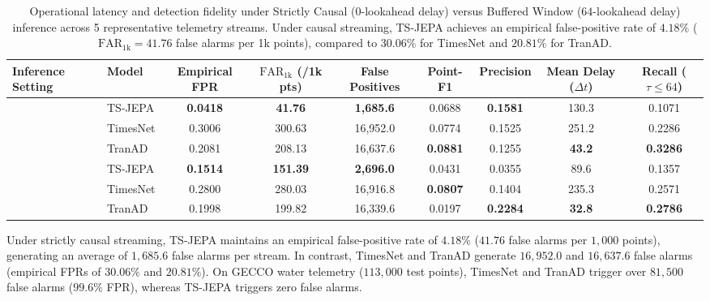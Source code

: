 \begin{table}[t]
\centering
\small
\caption{Operational latency and detection fidelity under Strictly Causal ($0$-lookahead delay) versus Buffered Window ($64$-lookahead delay) inference across 5 representative telemetry streams. Under causal streaming, TS-JEPA achieves an empirical false-positive rate of $4.18\%$ ($\text{FAR}_{1\text{k}} = 41.76$ false alarms per 1k points), compared to $30.06\%$ for TimesNet and $20.81\%$ for TranAD.}
\label{tab:causal_vs_buffered}
\scriptsize
\setlength{\tabcolsep}{2.5pt}
\begin{tabular}{@{}llccccccc@{}}
\toprule
\textbf{Inference Setting} & \textbf{Model} & \textbf{Empirical FPR} & \textbf{$\text{FAR}_{1\text{k}}$ (/1k pts)} & \textbf{False Positives} & \textbf{Point-F1} & \textbf{Precision} & \textbf{Mean Delay ($\Delta t$)} & \textbf{Recall ($\tau \le 64$)} \\
\midrule
{} 
& TS-JEPA & \textbf{0.0418} & \textbf{41.76} & \textbf{1,685.6} & 0.0688 & \textbf{0.1581} & 130.3 & 0.1071 \\
& TimesNet & 0.3006 & 300.63 & 16,952.0 & 0.0774 & 0.1525 & 251.2 & 0.2286 \\
& TranAD & 0.2081 & 208.13 & 16,637.6 & \textbf{0.0881} & 0.1255 & \textbf{43.2} & \textbf{0.3286} \\
\midrule
{} 
& TS-JEPA & \textbf{0.1514} & \textbf{151.39} & \textbf{2,696.0} & 0.0431 & 0.0355 & 89.6 & 0.1357 \\
& TimesNet & 0.2800 & 280.03 & 16,916.8 & \textbf{0.0807} & 0.1404 & 235.3 & 0.2571 \\
& TranAD & 0.1998 & 199.82 & 16,339.6 & 0.0197 & \textbf{0.2284} & \textbf{32.8} & \textbf{0.2786} \\
\bottomrule
\end{tabular}
\end{table}

Under strictly causal streaming, TS-JEPA maintains an empirical false-positive rate of $4.18\%$ ($41.76$ false alarms per $1{,}000$ points), generating an average of $1{,}685.6$ false alarms per stream. In contrast, TimesNet and TranAD generate $16{,}952.0$ and $16{,}637.6$ false alarms (empirical FPRs of $30.06\%$ and $20.81\%$). On GECCO water telemetry ($113{,}000$ test points), TimesNet and TranAD trigger over $81{,}500$ false alarms ($99.6\%$ FPR), whereas TS-JEPA triggers zero false alarms.

